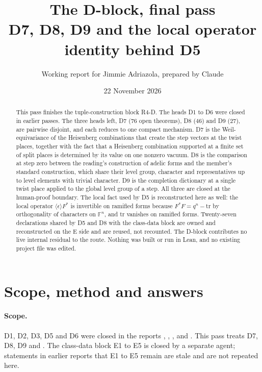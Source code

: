 \documentclass[11pt]{article}
\title{The D-block, final pass\\ D7, D8, D9 and the local operator identity behind D5}
\author{Working report for Jimmie Adriazola, prepared by Claude}
\date{22 November 2026}
\newcommand{\Fq}{\mathbb F}
\theoremstyle{definition}
\theoremstyle{remark}
\begin{document}
\maketitle

\begin{abstract}
This pass finishes the tuple-construction block R4-D. The heads D1 to D6 were closed in earlier passes. The three heads left, D7 ($76$ open theorems), D8 ($46$) and D9 ($27$), are pairwise disjoint, and each reduces to one compact mechanism. D7 is the Weil-equivariance of the Heisenberg combinations that create the step vectors at the twist places, together with the fact that a Heisenberg combination supported at a finite set of split places is determined by its value on one nonzero vacuum. D8 is the comparison at step zero between the reading's construction of adelic forms and the member's standard construction, which share their level group, character and representatives up to level elements with trivial character. D9 is the completion dictionary at a single twist place applied to the global level group of a step. All three are closed at the human-proof boundary. The local fact  used by D5 is reconstructed here as well: the local operator $\langle\epsilon\rangle F^{*}$ is invertible on ramified forms because $F^{*}F=q^{n}-\mathrm{tr}$ by orthogonality of characters on $\Fq^{n}$, and $\mathrm{tr}$ vanishes on ramified forms. Twenty-seven declarations shared by D5 and D8 with the class-data block are owned and reconstructed on the E side and are reused, not recounted. The D-block contributes no live internal residual to the route. Nothing was built or run in Lean, and no existing project file was edited.
\end{abstract}

\tableofcontents

\section{Scope, method and answers}

\paragraph{Scope.} D1, D2, D3, D5 and D6 were closed in the reports , , ,  and . This pass treats D7, D8, D9 and . The class-data block E1 to E5 is closed by a separate agent; statements in earlier reports that E1 to E5 remain are stale and are not repeated here.
\end{document}
